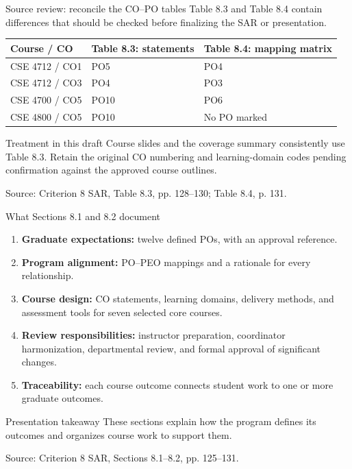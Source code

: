 \documentclass[aspectratio=169,11pt]{beamer}
\newcommand{\source}[1]{\par\vfill{\tiny\color{gray}Source: Criterion 8 SAR, #1.}}
\begin{document}
\begin{frame}{Source review: reconcile the CO--PO tables}
\footnotesize
Table 8.3 and Table 8.4 contain differences that should be checked before finalizing the SAR or presentation.
\par\medskip\noindent
\renewcommand{\arraystretch}{1.4}
\begin{tabularx}{\textwidth}{@{}p{36mm}Y Y@{}}
\toprule\textbf{Course / CO}&\textbf{Table 8.3: statements}&\textbf{Table 8.4: mapping matrix}\\\midrule
CSE 4712 / CO1&PO5&PO4\\
CSE 4712 / CO3&PO4&PO3\\
CSE 4700 / CO5&PO10&PO6\\
CSE 4800 / CO5&PO10&No PO marked\\
\bottomrule
\end{tabularx}
\begin{block}{Treatment in this draft}
Course slides and the coverage summary consistently use Table 8.3. Retain the original CO numbering and learning-domain codes pending confirmation against the approved course outlines.
\end{block}
\source{Table 8.3, pp. 128--130; Table 8.4, p. 131}
\end{frame}

\begin{frame}{What Sections 8.1 and 8.2 document}
\begin{enumerate}
\item \textbf{Graduate expectations:} twelve defined POs, with an approval reference.
\item \textbf{Program alignment:} PO--PEO mappings and a rationale for every relationship.
\item \textbf{Course design:} CO statements, learning domains, delivery methods, and assessment tools for seven selected core courses.
\item \textbf{Review responsibilities:} instructor preparation, coordinator harmonization, departmental review, and formal approval of significant changes.
\item \textbf{Traceability:} each course outcome connects student work to one or more graduate outcomes.
\end{enumerate}
\begin{exampleblock}{Presentation takeaway}
These sections explain how the program defines its outcomes and organizes course work to support them.
\end{exampleblock}
\source{Sections 8.1--8.2, pp. 125--131}
\end{frame}
\end{document}
